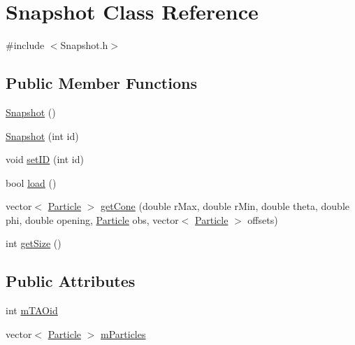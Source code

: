 \hypertarget{classSnapshot}{}\section{Snapshot Class Reference}
\label{classSnapshot}


{\ttfamily \#include $<$Snapshot.\+h$>$}

\subsection*{Public Member Functions}
\begin{DoxyCompactItemize}
\item 
\hyperlink{classSnapshot_afbb9ea1d6bd1c57817fb2de4484d19e5}{Snapshot} ()
\item 
\hyperlink{classSnapshot_a187303891773ed25d50f0c8904543ad3}{Snapshot} (int id)
\item 
void \hyperlink{classSnapshot_af32d0c9dff01edc6fc7123c68acd90b2}{set\+I\+D} (int id)
\item 
bool \hyperlink{classSnapshot_a316f9251424c8b828aad00282264fef4}{load} ()
\item 
vector$<$ \hyperlink{structParticle}{Particle} $>$ \hyperlink{classSnapshot_ad2180a60828caf9312a95cf1290177f2}{get\+Cone} (double r\+Max, double r\+Min, double theta, double phi, double opening, \hyperlink{structParticle}{Particle} obs, vector$<$ \hyperlink{structParticle}{Particle} $>$ offsets)
\item 
int \hyperlink{classSnapshot_afcaaea0e25497ab47e1ac6cdc04cd27c}{get\+Size} ()
\end{DoxyCompactItemize}
\subsection*{Public Attributes}
\begin{DoxyCompactItemize}
\item 
int \hyperlink{classSnapshot_a819b00f164775a0ec42023903ebb20ee}{m\+T\+A\+Oid}
\item 
vector$<$ \hyperlink{structParticle}{Particle} $>$ \hyperlink{classSnapshot_a96ba382e41a4fa8bd4de0e3e999be8f1}{m\+Particles}
\end{DoxyCompactItemize}
